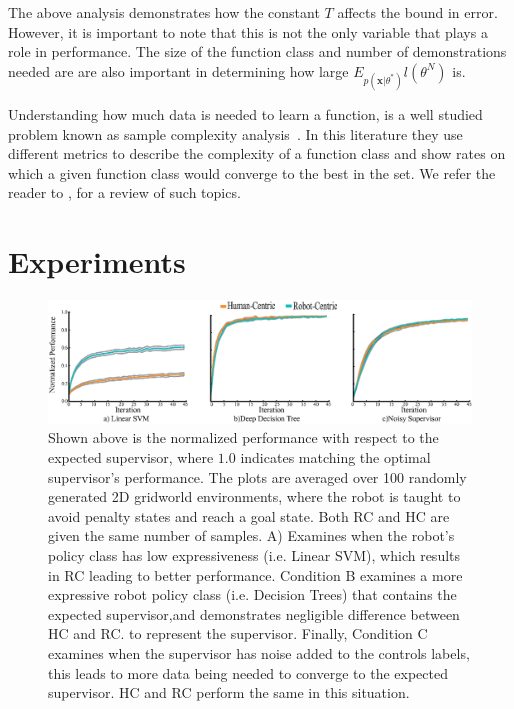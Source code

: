 \documentclass[10pt, conference]{ieeeconf}      %
\newcommand{\bx}{\mathbf{x}}
\newcommand{\mlnote}[1]{\ifthenelse{ \boolean{include-notes}}%
 {\textcolor{purple}{\textbf{ML: #1}}}{}}
\begin{document}
  

The above analysis demonstrates how the constant $T$ affects the bound in error. However, it is important to note that this is not the only variable that plays a role in performance. The size of the function class and number of demonstrations needed are are also important in determining how large $E_{p(\bx|\theta^*)} l(\theta^N)$ is. 

Understanding how much data is needed to learn a function, is a well studied problem known as sample complexity analysis~\cite{anthony2009neural,bartlett2002rademacher,kakade2009complexity}. In this literature they use different metrics to describe the complexity of a function class and show rates on which a given function class would converge to the best in the set. We refer the reader to \cite{vapnik2013nature}, for a review of such topics. 

\section{Experiments}

\begin{figure}
\includegraphics{f_figs/var_grid.eps}
\caption{
    \footnotesize
Shown above is the normalized performance with respect to the expected supervisor, where $1.0$ indicates matching the optimal supervisor's performance. The plots are averaged over 100 randomly generated 2D gridworld environments,  where the robot is taught to avoid penalty states and reach a goal state. Both RC and HC are given the same number of samples. A) Examines when the robot's policy class has low expressiveness (i.e. Linear SVM), which results in RC  leading to better performance. Condition B examines a more expressive robot policy class (i.e. Decision Trees) that contains the expected supervisor,and demonstrates negligible difference between HC and RC.  to represent the supervisor.  Finally, Condition C examines when the supervisor has noise added to the controls labels, this leads to more data being needed to converge to the expected supervisor. HC and RC perform the same in this situation.  }
\vspace*{-20pt}
\label{fig:var}
\end{figure}
\end{document}
